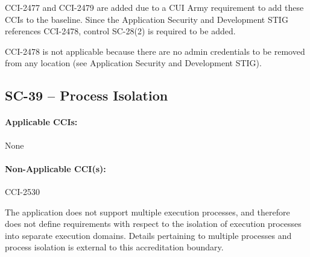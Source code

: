 \documentclass[letterpaper, 10pt, twoside]{article}
\begin{document}
CCI-2477 and CCI-2479 are added due to a CUI Army requirement to add these CCIs to the baseline. Since the Application Security and Development STIG references CCI-2478, control SC-28(2) is required to be added.

CCI-2478 is not applicable because there are no admin credentials to be removed from any location (see Application Security and Development STIG).

\subsection{SC-39 -- Process Isolation}

\paragraph{Applicable CCIs:} None

\paragraph{Non-Applicable CCI(s):} CCI-2530

The application does not support multiple execution processes, and therefore does not define requirements with respect to the isolation of execution processes into separate execution domains. Details pertaining to multiple processes and process isolation is external to this accreditation boundary.

\clearpage
\printbibliography
\end{document}
